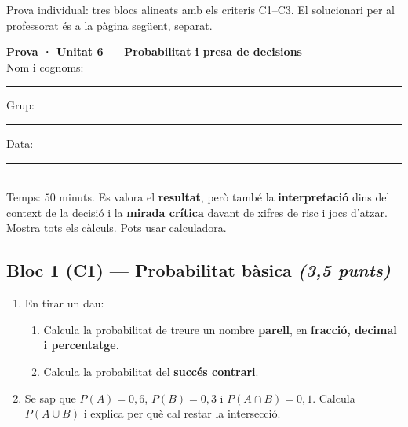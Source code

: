 %
{Prova individual: tres blocs alineats amb els criteris C1–C3. El solucionari per al professorat és a la pàgina següent, separat.}

\begin{tcolorbox}[colback=white, colframe=udnavy, boxrule=0.8pt, arc=2pt,
  left=8pt, right=8pt, top=6pt, bottom=6pt]
\textbf{Prova · Unitat 6 — Probabilitat i presa de decisions}\\[4pt]
Nom i cognoms: \rule{6.5cm}{0.4pt} \quad Grup: \rule{1.6cm}{0.4pt} \quad Data: \rule{2.2cm}{0.4pt}\\[6pt]
\small Temps: $50$ minuts. Es valora el \textbf{resultat}, però també la
\textbf{interpretació} dins del context de la decisió i la \textbf{mirada crítica}
davant de xifres de risc i jocs d'atzar. Mostra tots els càlculs. Pots usar calculadora.
\end{tcolorbox}

\vspace{0.4em}

\subsection*{Bloc 1 (C1) — Probabilitat bàsica \hfill \normalfont\itshape (3,5 punts)}

\begin{enumerate}[label=\textbf{\arabic*.}, leftmargin=2em, itemsep=8pt]
  \item En tirar un dau:
    \begin{enumerate}[label=\alph*), leftmargin=1.6em, topsep=2pt]
      \item Calcula la probabilitat de treure un nombre \textbf{parell}, en
            \textbf{fracció, decimal i percentatge}.
      \item Calcula la probabilitat del \textbf{succés contrari}.
    \end{enumerate}
  \item Se sap que $P(A)=0,6$, $P(B)=0,3$ i $P(A\cap B)=0,1$. Calcula $P(A\cup B)$ i
        explica per què cal restar la intersecció.
\end{enumerate}

